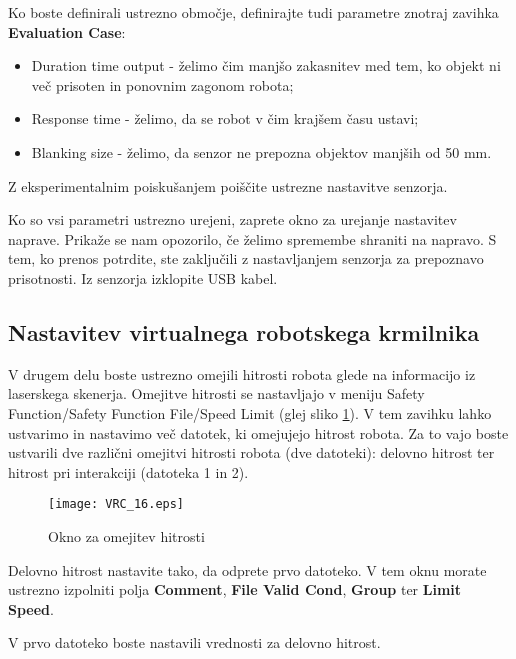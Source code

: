 Ko boste definirali ustrezno območje, definirajte tudi parametre znotraj zavihka \textbf{Evaluation Case}:
\begin{itemize}
	\item Duration time output - \v zelimo čim manjšo zakasnitev med tem, ko objekt ni več prisoten in ponovnim zagonom robota;
	\item Response time - \v zelimo, da se robot v čim krajšem času ustavi;
	\item Blanking size - \v zelimo, da senzor ne prepozna objektov manjših od 50 mm.
\end{itemize}

Z eksperimentalnim poiskušanjem poiščite ustrezne nastavitve senzorja.

Ko so vsi parametri ustrezno urejeni, zaprete okno za urejanje nastavitev naprave. Prikaže se nam opozorilo, če želimo spremembe shraniti na napravo. S tem, ko prenos potrdite, ste zaključili z nastavljanjem senzorja za prepoznavo prisotnosti. Iz senzorja izklopite USB kabel.

\subsection{Nastavitev virtualnega robotskega krmilnika} \label{sim3}

V drugem delu boste ustrezno omejili hitrosti robota glede na informacijo iz laserskega skenerja. Omejitve hitrosti se nastavljajo v meniju Safety Function/Safety Function File/Speed Limit (glej sliko \ref{fig:VRC_16}).  V tem zavihku lahko ustvarimo in nastavimo več datotek, ki omejujejo hitrost robota. Za to vajo boste ustvarili dve različni omejitvi hitrosti robota (dve datoteki): delovno hitrost ter hitrost pri interakciji (datoteka 1 in 2).


\begin{figure}[hbt]
	\centering
	\texttt{[image: VRC\_16.eps]}
	\caption{Okno za omejitev hitrosti}
	\label{fig:VRC_16}
\end{figure}

Delovno hitrost nastavite tako, da odprete prvo datoteko. V tem oknu morate ustrezno izpolniti polja \textbf{Comment}, \textbf{File Valid Cond}, \textbf{Group} ter \textbf{Limit Speed}.

V prvo datoteko boste nastavili vrednosti za delovno hitrost.

